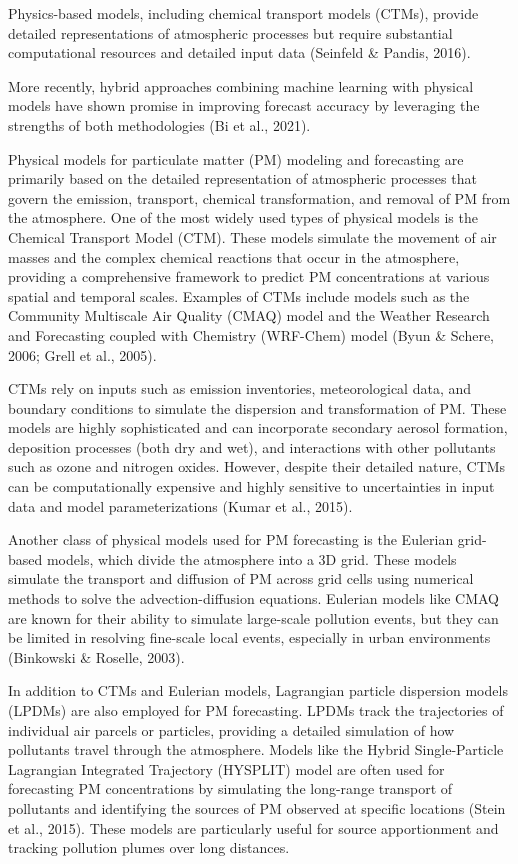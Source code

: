 Physics-based models, including chemical transport models (CTMs), provide
detailed representations of atmospheric processes but require substantial
computational resources and detailed input data (Seinfeld \& Pandis, 2016).

More recently, hybrid approaches combining machine learning with physical models
have shown promise in improving forecast accuracy by leveraging the strengths of
both methodologies (Bi et al., 2021).


Physical models for particulate matter (PM) modeling and forecasting are
primarily based on the detailed representation of atmospheric processes that
govern the emission, transport, chemical transformation, and removal of PM from
the atmosphere. One of the most widely used types of physical models is the
Chemical Transport Model (CTM). These models simulate the movement of air masses
and the complex chemical reactions that occur in the atmosphere, providing a
comprehensive framework to predict PM concentrations at various spatial and
temporal scales. Examples of CTMs include models such as the Community
Multiscale Air Quality (CMAQ) model and the Weather Research and Forecasting
coupled with Chemistry (WRF-Chem) model (Byun \& Schere, 2006; Grell et al.,
2005).


CTMs rely on inputs such as emission inventories, meteorological data, and
boundary conditions to simulate the dispersion and transformation of PM. These
models are highly sophisticated and can incorporate secondary aerosol formation,
deposition processes (both dry and wet), and interactions with other pollutants
such as ozone and nitrogen oxides. However, despite their detailed nature, CTMs
can be computationally expensive and highly sensitive to uncertainties in input
data and model parameterizations (Kumar et al., 2015).


Another class of physical models used for PM forecasting is the Eulerian
grid-based models, which divide the atmosphere into a 3D grid. These models
simulate the transport and diffusion of PM across grid cells using numerical
methods to solve the advection-diffusion equations. Eulerian models like CMAQ
are known for their ability to simulate large-scale pollution events, but they
can be limited in resolving fine-scale local events, especially in urban
environments (Binkowski \& Roselle, 2003).


In addition to CTMs and Eulerian models, Lagrangian particle dispersion models
(LPDMs) are also employed for PM forecasting. LPDMs track the trajectories of
individual air parcels or particles, providing a detailed simulation of how
pollutants travel through the atmosphere. Models like the Hybrid Single-Particle
Lagrangian Integrated Trajectory (HYSPLIT) model are often used for forecasting
PM concentrations by simulating the long-range transport of pollutants and
identifying the sources of PM observed at specific locations (Stein et al.,
2015). These models are particularly useful for source apportionment and
tracking pollution plumes over long distances.

